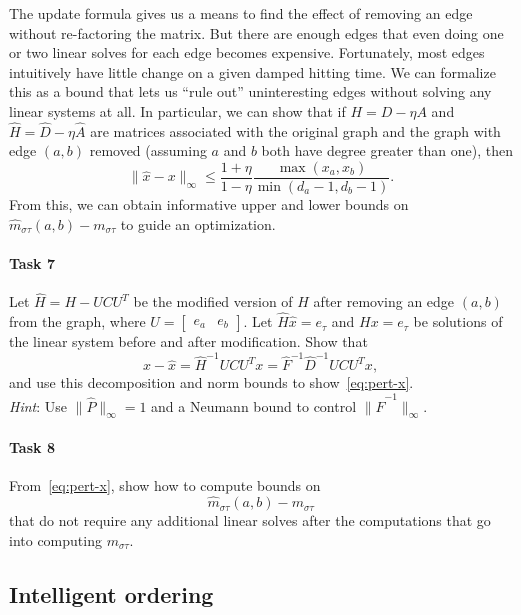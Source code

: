 \documentclass[12pt, leqno]{article}
\begin{document}
The update formula gives us a means to find the effect of removing an
edge without re-factoring the matrix.  But there are enough edges that
even doing one or two linear solves for each edge becomes expensive.
Fortunately, most edges intuitively have little change on a given
damped hitting time.  We can formalize this as a bound that lets us
``rule out'' uninteresting edges without solving any linear systems at
all.  In particular, we can show that if $H = D-\eta A$ and
$\hat{H} = \hat{D} - \eta \hat{A}$ are matrices associated with the
original graph and the graph with edge $(a,b)$ removed (assuming $a$
and $b$ both have degree greater than one), then
\begin{equation} \label{eq:pert-x}
\|\hat{x}-x\|_{\infty} \leq
  \frac{1+\eta}{1-\eta}
  \frac{\max(x_a, x_b)}{\min(d_a-1, d_b-1)}.
\end{equation}
From this, we can obtain informative upper and lower bounds on
$\hat{m}_{\sigma \tau}(a,b)-m_{\sigma \tau}$ to guide an optimization.

\paragraph*{Task 7}
Let $\hat{H} = H - UCU^T$ be the modified version of $H$ after
removing an edge $(a,b)$ from the graph,
where $U = \begin{bmatrix} e_a & e_b \end{bmatrix}$.  Let
$\hat{H} \hat{x} = e_{\tau}$ and $Hx = e_{\tau}$ be solutions
of the linear system before and after modification.
Show that
\[
  x-\hat{x} = \hat{H}^{-1} UCU^T x = \hat{F}^{-1} \hat{D}^{-1} U C U^T x,
\]
and use this decomposition and norm bounds to show~\eqref{eq:pert-x}. \\[1mm]
{\em Hint}: Use $\|\hat{P}\|_\infty = 1$ and a Neumann
bound to control $\|\hat{F}^{-1}\|_\infty$.

\paragraph*{Task 8}
From~\eqref{eq:pert-x}, show how to compute bounds on
\[
  \hat{m}_{\sigma \tau}(a,b) - m_{\sigma \tau}
\]
that do not require any additional linear solves after
the computations that go into computing $m_{\sigma \tau}$.

\subsection*{Intelligent ordering}
\end{document}
